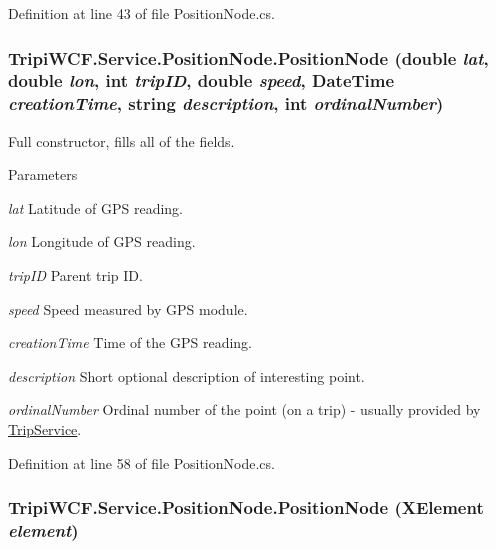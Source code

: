 Definition at line 43 of file PositionNode.cs.\hypertarget{class_tripi_w_c_f_1_1_service_1_1_position_node_a43c0c1c461f8f70565c95da1d3681fcc}{
\subsubsection[{PositionNode}]{\setlength{\rightskip}{0pt plus 5cm}TripiWCF.Service.PositionNode.PositionNode (double {\em lat}, \/  double {\em lon}, \/  int {\em tripID}, \/  double {\em speed}, \/  DateTime {\em creationTime}, \/  string {\em description}, \/  int {\em ordinalNumber})}}
\label{class_tripi_w_c_f_1_1_service_1_1_position_node_a43c0c1c461f8f70565c95da1d3681fcc}


Full constructor, fills all of the fields. 
\begin{DoxyParams}{Parameters}
\item[{\em lat}]Latitude of GPS reading.\item[{\em lon}]Longitude of GPS reading.\item[{\em tripID}]Parent trip ID.\item[{\em speed}]Speed measured by GPS module.\item[{\em creationTime}]Time of the GPS reading.\item[{\em description}]Short optional description of interesting point.\item[{\em ordinalNumber}]Ordinal number of the point (on a trip) -\/ usually provided by \hyperlink{class_tripi_w_c_f_1_1_service_1_1_trip_service}{TripService}.\end{DoxyParams}


Definition at line 58 of file PositionNode.cs.\hypertarget{class_tripi_w_c_f_1_1_service_1_1_position_node_ab862d46452e5a7bafc91b045891a9a47}{
\subsubsection[{PositionNode}]{\setlength{\rightskip}{0pt plus 5cm}TripiWCF.Service.PositionNode.PositionNode (XElement {\em element})}}
\label{class_tripi_w_c_f_1_1_service_1_1_position_node_ab862d46452e5a7bafc91b045891a9a47}


